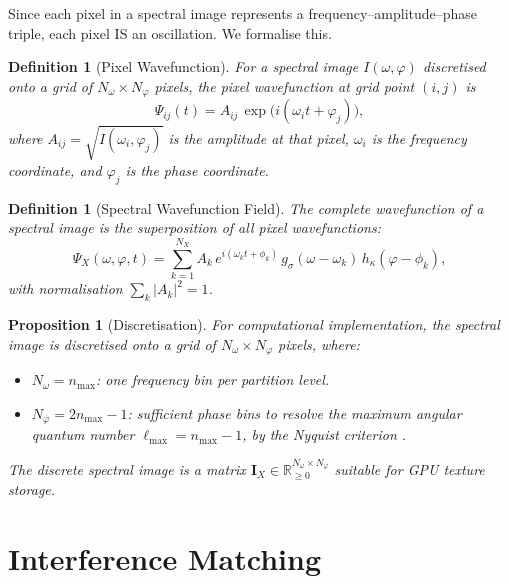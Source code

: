\documentclass[11pt,twocolumn,a4paper]{article}
\newtheorem{proposition}[theorem]{Proposition}
\newtheorem{definition}[theorem]{Definition}
\newcommand{\R}{\mathbb{R}}
\begin{document}
Since each pixel in a spectral image represents a frequency--amplitude--phase
triple, each pixel IS an oscillation. We formalise this.

\begin{definition}[Pixel Wavefunction]
\label{def:pixel_wavefunction}
For a spectral image $I(\omega, \varphi)$ discretised onto a grid of
$N_\omega \times N_\varphi$ pixels, the \emph{pixel wavefunction} at
grid point $(i, j)$ is
\begin{equation}
\label{eq:pixel_wavefunction}
  \Psi_{ij}(t) = A_{ij} \, \exp\bigl(i(\omega_i t + \varphi_j)\bigr),
\end{equation}
where $A_{ij} = \sqrt{I(\omega_i, \varphi_j)}$ is the amplitude at that
pixel, $\omega_i$ is the frequency coordinate, and $\varphi_j$ is the
phase coordinate.
\end{definition}

\begin{definition}[Spectral Wavefunction Field]
\label{def:wavefunction_field}
The complete wavefunction of a spectral image is the superposition of
all pixel wavefunctions:
\begin{equation}
\label{eq:wavefunction_field}
  \Psi_X(\omega, \varphi, t) = \sum_{k=1}^{N_X} A_k \,
    e^{i(\omega_k t + \phi_k)} \, g_\sigma(\omega - \omega_k) \,
    h_\kappa(\varphi - \phi_k),
\end{equation}
with normalisation $\sum_k |A_k|^2 = 1$.
\end{definition}

\begin{proposition}[Discretisation]
\label{prop:discretisation}
For computational implementation, the spectral image is discretised onto
a grid of $N_\omega \times N_\varphi$ pixels, where:
\begin{itemize}[nosep]
  \item $N_\omega = n_{\max}$: one frequency bin per partition level.
  \item $N_\varphi = 2n_{\max} - 1$: sufficient phase bins to resolve
    the maximum angular quantum number $\ell_{\max} = n_{\max} - 1$,
    by the Nyquist criterion \citep{nyquist1928}.
\end{itemize}
The discrete spectral image is a matrix
$\mathbf{I}_X \in \R_{\geq 0}^{N_\omega \times N_\varphi}$ suitable
for GPU texture storage.
\end{proposition}


\section{Interference Matching}
\label{sec:interference_matching}
\end{document}
